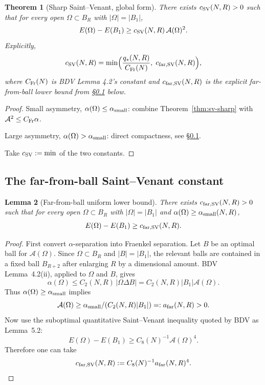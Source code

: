 \documentclass[11pt]{article}
\newtheorem{theorem}{Theorem}
\newtheorem{lemma}[theorem]{Lemma}
\theoremstyle{definition}
\newcommand{\abs}[1]{\left|#1\right|}
\begin{document}
\begin{theorem}[Sharp Saint--Venant, global form]\label{thm:sv-global}
There exists $c_{\rm SV}(N,R)>0$ such that for every open
$\Omega\subset B_R$ with $\abs{\Omega}=\abs{B_1}$,
\[
E(\Omega)-E(B_1)\ge c_{\rm SV}(N,R)\,\mathcal A(\Omega)^2.
\]
Explicitly,
\[
c_{\rm SV}(N,R)
=\min\Bigl(\frac{q_*(N,R)}{C_{\rm Fr}(N)},\;c_{\rm far,SV}(N,R)\Bigr),
\]
where $C_{\rm Fr}(N)$ is BDV Lemma 4.2's constant and $c_{\rm far,SV}(N,R)$
is the explicit far-from-ball lower bound from \S\ref{sec:far} below.
\end{theorem}

\begin{proof}
Small asymmetry, $\alpha(\Omega)\le\alpha_{\rm small}$:
combine Theorem~\ref{thm:sv-sharp} with $\mathcal A^2\le C_{\rm Fr}\alpha$.

Large asymmetry, $\alpha(\Omega)>\alpha_{\rm small}$:
direct compactness, see \S\ref{sec:far}.

Take $c_{\rm SV}:=\min$ of the two constants.
\end{proof}

\subsection{The far-from-ball Saint--Venant constant}\label{sec:far}

\begin{lemma}[Far-from-ball uniform lower bound]\label{lem:far}
There exists $c_{\rm far,SV}(N,R)>0$ such that for every open
$\Omega\subset B_R$ with $\abs{\Omega}=\abs{B_1}$ and
$\alpha(\Omega)\ge\alpha_{\rm small}(N,R)$,
\[
E(\Omega)-E(B_1)\ge c_{\rm far,SV}(N,R).
\]
\end{lemma}

\begin{proof}
First convert $\alpha$-separation into Fraenkel separation. Let $B$ be an
optimal ball for $\mathcal A(\Omega)$. Since $\Omega\subset B_R$ and
$|B|=|B_1|$, the relevant balls are contained in a fixed ball $B_{R+2}$ after
enlarging $R$ by a dimensional amount. BDV Lemma~4.2(ii), applied to
$\Omega$ and $B$, gives
\[
\alpha(\Omega)\le C_2(N,R)\,|\Omega\Delta B|
=C_2(N,R)|B_1|\mathcal A(\Omega).
\]
Thus $\alpha(\Omega)\ge\alpha_{\rm small}$ implies
\[
\mathcal A(\Omega)\ge
\alpha_{\rm small}/(C_2(N,R)|B_1|)=:a_{\rm far}(N,R)>0.
\]
Now use the suboptimal quantitative Saint--Venant inequality quoted by BDV as
Lemma~5.2:
\[
E(\Omega)-E(B_1)\ge C_8(N)^{-1}\mathcal A(\Omega)^4.
\]
Therefore one can take
\[
c_{\rm far,SV}(N,R):=C_8(N)^{-1}a_{\rm far}(N,R)^4.
\]
\end{proof}
\end{document}
